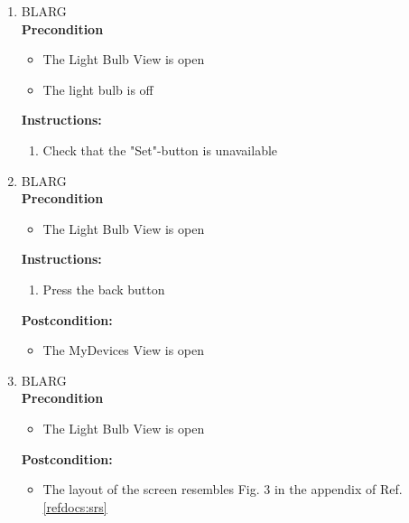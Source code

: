 \documentclass[a4paper]{article}
\newlength{\testlabellength}
\newenvironment{testlist}{\begin{enumerate}[label=\bfseries Instruction \thesubsection.\arabic* , labelindent=0pt, labelwidth=\testlabellength , leftmargin=2cm]}{\end{enumerate}}
\newenvironment{precondition}{
{\color{white}BLARG}\\ 
\textbf{Precondition}
\begin{itemize}[labelindent=0cm, labelwidth=2cm , leftmargin=1cm]
}
{\end{itemize}}
\newenvironment{instruction}{
\textbf{Instructions:}
\begin{enumerate}[label=\bfseries  \arabic*., labelindent=0cm, labelwidth=2cm , leftmargin=1cm]
}
{\end{enumerate}}
\newenvironment{postcondition}{
\textbf{Postcondition:}
\begin{itemize}[labelindent=0cm, labelwidth=2cm , leftmargin=1cm]
}
{\end{itemize}}
\begin{document}
\begin{appendices}
\begin{testlist}
	\item
		\begin{precondition}
			\item The Light Bulb View is open
			\item The light bulb is off
		\end{precondition}
		\begin{instruction}
			\item Check that the "Set"-button is unavailable
		\end{instruction}


	\item
		\begin{precondition}
			\item The Light Bulb View is open
		\end{precondition}
		\begin{instruction}
			\item Press the back button
		\end{instruction}
		\begin{postcondition}
			\item The MyDevices View is open
		\end{postcondition}
    
	\item
		\begin{precondition}
			\item The Light Bulb View is open
		\end{precondition}
		\begin{postcondition}
			\item The layout of the screen resembles Fig. 3 in the appendix of Ref. \ref{refdocs:srs}
		\end{postcondition}


\end{testlist}
\end{appendices}
\end{document}
